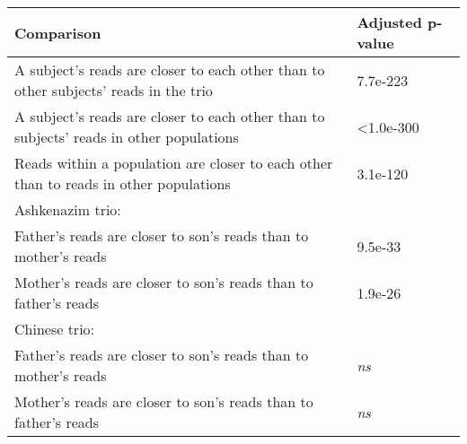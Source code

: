 \begin{samepage} \begin{table}[h!] \small \begin{tabular}{ll}
\hline
\textbf{Comparison}                                                                     & \textbf{Adjusted p-value} \\
\hline
A subject's reads are closer to each other than to other subjects' reads in the trio    & 7.7e-223                  \\
A subject's reads are closer to each other than to subjects' reads in other populations & <1.0e-300                 \\
Reads within a population are closer to each other than to reads in other populations   & 3.1e-120                  \\
Ashkenazim trio:                                                                        & \textbf{}                 \\
Father's reads are closer to son's reads than to mother's reads                         & 9.5e-33                   \\
Mother's reads are closer to son's reads than to father's reads                         & 1.9e-26                   \\
Chinese trio:                                                                           & \textbf{}                 \\
Father's reads are closer to son's reads than to mother's reads                         & \textit{ns}               \\
Mother's reads are closer to son's reads than to father's reads                         & \textit{ns}               \\
\hline
\end{tabular}
\caption{}
\label{}
\end{table}
\end{samepage}

